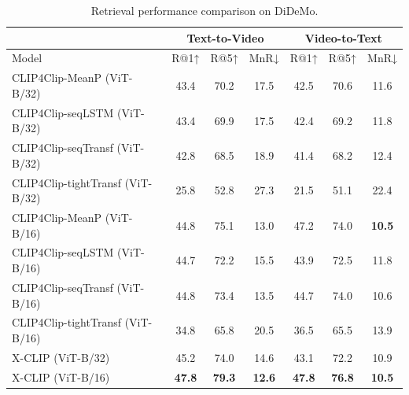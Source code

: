 \documentclass[sigconf]{acmart}
\begin{document}
\begin{table}[]
\caption{Retrieval performance comparison on DiDeMo.}
\begin{tabular}{l|ccc|ccc}
\hline
           & \multicolumn{3}{c|}{Text-to-Video}             & \multicolumn{3}{c}{Video-to-Text}            \\ \hline
Model      & R@1↑          & R@5↑          & MnR↓          & R@1↑          & R@5↑          & MnR↓         \\ \hline
CLIP4Clip-MeanP (ViT-B/32)  & 43.4          & 70.2          & 17.5          & 42.5          & 70.6          & 11.6          \\
 CLIP4Clip-seqLSTM (ViT-B/32)     & 43.4 & 69.9 & 17.5 & 42.4 & 69.2 & 11.8 \\
 CLIP4Clip-seqTransf (ViT-B/32)    & 42.8 & 68.5 & 18.9 & 41.4 & 68.2 & 12.4 \\
 CLIP4Clip-tightTransf (ViT-B/32)   & 25.8 & 52.8 & 27.3 & 21.5 & 51.1 & 22.4 \\
CLIP4Clip-MeanP (ViT-B/16)  & 44.8          & 75.1          & 13.0          & 47.2          & 74.0          & \textbf{10.5} \\ 
CLIP4Clip-seqLSTM (ViT-B/16)  & 44.7 & 72.2 & 15.5 & 43.9 & 72.5 & 11.8  \\ 
CLIP4Clip-seqTransf (ViT-B/16)  & 44.8          & 73.4          & 13.5          & 44.7          & 74.0          & 10.6 \\ 
CLIP4Clip-tightTransf (ViT-B/16)  & 34.8 & 65.8 & 20.5 & 36.5 & 65.5 & 13.9 \\ 
\hline
X-CLIP (ViT-B/32)    & 45.2          & 74.0          & 14.6          & 43.1          & 72.2          & 10.9          \\
X-CLIP (ViT-B/16)    & \textbf{47.8} & \textbf{79.3} & \textbf{12.6} & \textbf{47.8} & \textbf{76.8} & \textbf{10.5} \\ \hline
\end{tabular}
\label{tab:didemo_performance2}
\end{table}
\end{document}
